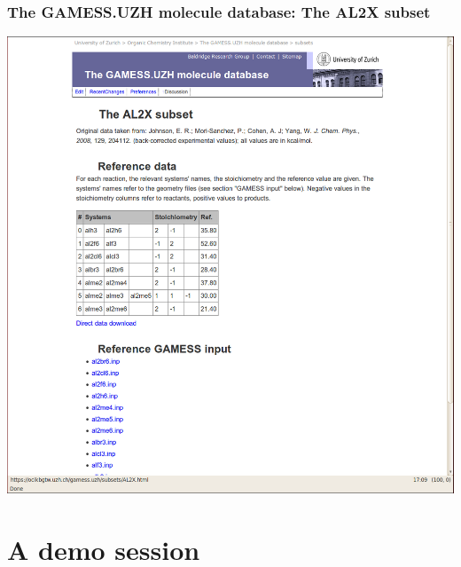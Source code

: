 \documentclass {beamer}
\begin{document}
\begin{frame}
  \frametitle{The GAMESS.UZH molecule database: The AL2X subset}
  \begin{center}
    \includegraphics[height=0.9\textheight]{gamess-uzh-2}
  \end{center}
\end{frame}


\section{A demo session}
\end{document}
